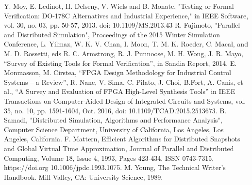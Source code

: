 \documentclass[conference]{IEEEtran}
\begin{document}
\begin{thebibliography}{00}
 Y. Moy, E. Ledinot, H. Delseny, V. Wiels and B. Monate, "Testing or Formal Verification: DO-178C Alternatives and Industrial Experience," in IEEE Software, vol. 30, no. 03, pp. 50-57, 2013.
doi: 10.1109/MS.2013.43
 R. Fujimoto, "Parallel and Distributed Simulation", Proceedings of the 2015 Winter Simulation Conference, L. Yilmaz, W. K. V. Chan, I. Moon, T. M. K. Roeder, C. Macal, and M. D. Rossetti, eds
 R. C. Armstrong, R. J. Punnoose, M. H. Wong, J. R. Mayo, ``Survey of Existing Tools for Formal Verification'', in Sandia Report, 2014.
 E. Monmasson, M. Cirstea, ``FPGA Design Methodology for Industrial Control
Systems – a Review'', 
 R. Nane, V. Sima, C. Pilato, J. Choi, B.Fort, A. Canis, et al., ``A Survey and Evaluation of FPGA High-Level Synthesis Tools'' in IEEE Transactions on Computer-Aided Design of Integrated Circuits and Systems, vol. 35, no. 10, pp. 1591-1604, Oct. 2016, doi: 10.1109/TCAD.2015.2513673.
 B. Samadi, "Distributed Simulation, Algorithms and Performance Analysis", Computer Science
Department, University of California, Los Angeles, Los Angeles, California.
 F. Mattern, Efficient Algorithms for Distributed Snapshots and Global Virtual Time Approximation, Journal of Parallel and Distributed Computing, Volume 18, Issue 4, 1993, Pages 423-434, ISSN 0743-7315, https://doi.org 10.1006/jpdc.1993.1075.
 M. Young, The Technical Writer's Handbook. Mill Valley, CA: University Science, 1989.
\end{thebibliography}
\end{document}
